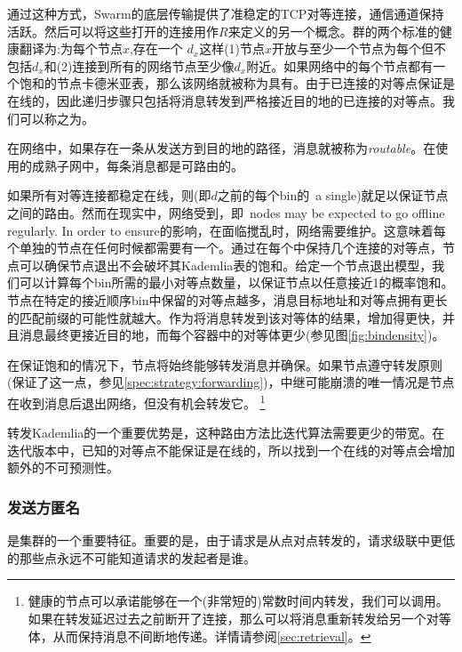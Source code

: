 通过这种方式，Swarm的底层传输提供了准稳定的TCP对等连接，通信通道保持活跃。然后可以将这些打开的连接用作$R$来定义的另一个概念。群的两个标准的健康翻译为:为每个节点$x$,存在一个 $d_x$这样(1)节点$x$开放与至少一个节点为每个但不包括$d_x$和(2)连接到所有的网络节点至少像$d_x$附近。如果网络中的每个节点都有一个饱和的节点卡德米亚表，那么该网络就被称为具有。由于已连接的对等点保证是在线的，因此递归步骤只包括将消息转发到严格接近目的地的已连接的对等点。我们可以称之为。


在网络中，如果存在一条从发送方到目的地的路径，消息就被称为\emph{routable}。在使用的成熟子网中，每条消息都是可路由的。

如果所有对等连接都稳定在线，则(即$d$之前的每个bin的\ a single)就足以保证节点之间的路由。然而在现实中，网络受到，即\ nodes may be expected to go offline regularly. In order to ensure的影响，在面临搅乱时，网络需要维护。这意味着每个单独的节点在任何时候都需要有一个。通过在每个中保持几个连接的对等点，节点可以确保节点退出不会破坏其Kademlia表的饱和。给定一个节点退出模型，我们可以计算每个bin所需的最小对等点数量，以保证节点以任意接近1的概率饱和。节点在特定的接近顺序bin中保留的对等点越多，消息目标地址和对等点拥有更长的匹配前缀的可能性就越大。作为将消息转发到该对等体的结果，增加得更快，并且消息最终更接近目的地，而每个容器中的对等体更少(参见图\ref{fig:bindensity})。



在保证饱和的情况下，节点将始终能够转发消息并确保。如果节点遵守转发原则(保证了这一点，参见\ref{spec:strategy:forwarding})，中继可能崩溃的唯一情况是节点在收到消息后退出网络，但没有机会转发它。%
%
\footnote{健康的节点可以承诺能够在一个(非常短的)常数时间内转发，我们可以调用。如果在转发延迟过去之前断开了连接，那么可以将消息重新转发给另一个对等体，从而保持消息不间断地传递。详情请参阅\ref{sec:retrieval}。
} 

转发Kademlia的一个重要优势是，这种路由方法比迭代算法需要更少的带宽。在迭代版本中，已知的对等点不能保证是在线的，所以找到一个在线的对等点会增加额外的不可预测性。

\subsubsection{发送方匿名}
是集群的一个重要特征。重要的是，由于请求是从点对点转发的，请求级联中更低的那些点永远不可能知道请求的发起者是谁。

